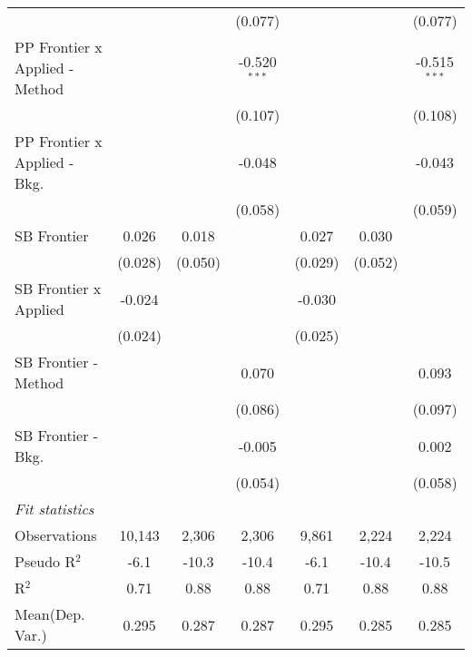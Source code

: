 \begin{tabular}{lcccccc}
                                  &                &              & (0.077)        &                &              & (0.077)\\   
   PP Frontier x Applied - Method &                &              & -0.520$^{***}$ &                &              & -0.515$^{***}$\\   
                                  &                &              & (0.107)        &                &              & (0.108)\\   
   PP Frontier x Applied - Bkg.   &                &              & -0.048         &                &              & -0.043\\   
                                  &                &              & (0.058)        &                &              & (0.059)\\   
   SB Frontier                    & 0.026          & 0.018        &                & 0.027          & 0.030        &   \\   
                                  & (0.028)        & (0.050)      &                & (0.029)        & (0.052)      &   \\   
   SB Frontier x Applied          & -0.024         &              &                & -0.030         &              &   \\   
                                  & (0.024)        &              &                & (0.025)        &              &   \\   
   SB Frontier - Method           &                &              & 0.070          &                &              & 0.093\\   
                                  &                &              & (0.086)        &                &              & (0.097)\\   
   SB Frontier - Bkg.             &                &              & -0.005         &                &              & 0.002\\   
                                  &                &              & (0.054)        &                &              & (0.058)\\   
   \midrule
   \emph{Fit statistics}\\
   Observations                   & 10,143         & 2,306        & 2,306          & 9,861          & 2,224        & 2,224\\  
   Pseudo R$^2$                   & -6.1           & -10.3        & -10.4          & -6.1           & -10.4        & -10.5\\  
   R$^2$                          & 0.71           & 0.88         & 0.88           & 0.71           & 0.88         & 0.88\\  
Mean(Dep. Var.) & 0.295 & 0.287 & 0.287 & 0.295 & 0.285 & 0.285 \\
   

\end{tabular}
